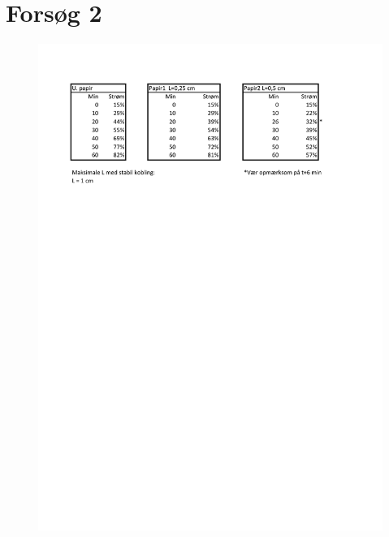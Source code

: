 \chapter{Forsøg 2} \label{bilag:forsg2}

\begin{figure}[htbp]

\centering
\includegraphics[scale=1]{Setup/forsg_2_bilag}
\label{figure:forsg2}

\end{figure}
